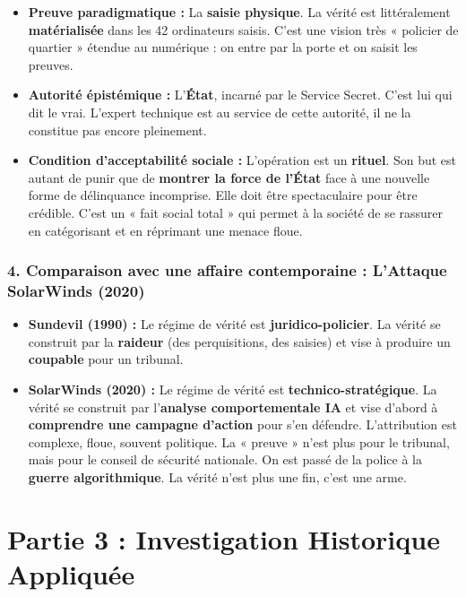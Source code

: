 \documentclass[12pt]{article}
\begin{document}
\begin{itemize}
\item \textbf{Preuve paradigmatique :} La \textbf{saisie physique}. La vérité est littéralement \textbf{matérialisée} dans les 42 ordinateurs saisis. C'est une vision très « policier de quartier » étendue au numérique : on entre par la porte et on saisit les preuves.
\item \textbf{Autorité épistémique :} L'\textbf{État}, incarné par le Service Secret. C'est lui qui dit le vrai. L'expert technique est au service de cette autorité, il ne la constitue pas encore pleinement.
\item \textbf{Condition d'acceptabilité sociale :} L'opération est un \textbf{rituel}. Son but est autant de punir que de \textbf{montrer la force de l'État} face à une nouvelle forme de délinquance incomprise. Elle doit être spectaculaire pour être crédible. C'est un « fait social total » qui permet à la société de se rassurer en catégorisant et en réprimant une menace floue.
\end{itemize}

\subsubsection{4. Comparaison avec une affaire contemporaine : L'Attaque SolarWinds (2020)}

\begin{itemize}
\item \textbf{Sundevil (1990) :} Le régime de vérité est \textbf{juridico-policier}. La vérité se construit par la \textbf{raideur} (des perquisitions, des saisies) et vise à produire un \textbf{coupable} pour un tribunal.
\item \textbf{SolarWinds (2020) :} Le régime de vérité est \textbf{technico-stratégique}. La vérité se construit par l'\textbf{analyse comportementale IA} et vise d'abord à \textbf{comprendre une campagne d'action} pour s'en défendre. L'attribution est complexe, floue, souvent politique. La « preuve » n'est plus pour le tribunal, mais pour le conseil de sécurité nationale. On est passé de la police à la \textbf{guerre algorithmique}. La vérité n'est plus une fin, c'est une arme.
\end{itemize}

\section{Partie 3 : Investigation Historique Appliquée}
\end{document}
